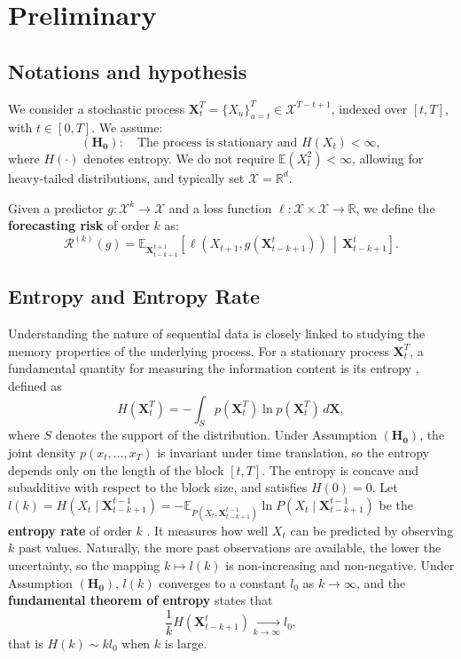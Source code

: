 \documentclass{article}
\begin{document}
\section{Preliminary}
\subsection{Notations and hypothesis} 

We consider a stochastic process $\mathbf{X}_{t}^{T} = \{X_u\}_{u=t}^{T} \in \mathcal{X}^{T-t+1}$, indexed over $[t, T]$, with $t \in [0, T]$. We assume:
\[
\mathbf{(H_0)}: \quad \text{The process is stationary and } H(X_t) < \infty,
\]
where $H(\cdot)$ denotes entropy. We do not require $\mathbb{E}(X_t^2) < \infty$, allowing for heavy-tailed distributions, and typically set $\mathcal{X} = \mathbb{R}^d$.

Given a predictor $g: \mathcal{X}^{k} \to \mathcal{X}$ and a loss function $\ell: \mathcal{X} \times \mathcal{X} \to \mathbb{R}$, we define the \textbf{forecasting risk} of order $k$ as:
\begin{equation}
\mathcal{R}^{(k)}(g) = \mathbb{E}_{\mathbf{X}_{t-k+1}^{t+1}} \left[ \ell(X_{t+1}, g(\mathbf{X}_{t-k+1}^{t})) \,\middle|\, \mathbf{X}_{t-k+1}^{t} \right].
\end{equation}

\subsection{Entropy and Entropy Rate}

Understanding the nature of sequential data is closely linked to studying the memory properties of the underlying process. For a stationary process $\mathbf{X}_{t}^{T}$, a fundamental quantity for measuring the information content is its entropy \cite{shannon1948mathematical}, defined as
\begin{equation}
    H(\mathbf{X}_{t}^{T}) = - \int_{S} p(\mathbf{X}_{t}^{T}) \ln p(\mathbf{X}_{t}^{T}) \, d\mathbf{X},
\end{equation}
where $S$ denotes the support of the distribution. Under Assumption $\mathbf{(H_0)}$, the joint density $p(x_t, \dots, x_T)$ is invariant under time translation, so the entropy depends only on the length of the block $[t, T]$. The entropy is concave and subadditive with respect to the block size, and satisfies $H(0) = 0$. Let $l(k) = H(X_{t} \mid \mathbf{X}_{t-k+1}^{t-1}) = -\mathbb{E}_{P(X_{t}, \mathbf{X}_{t-k+1}^{t-1})} \ln P(X_{t} \mid \mathbf{X}_{t-k+1}^{t-1})$ be the \textbf{entropy rate} of order $k$ \cite{cover1999elements}. It measures how well $X_{t}$ can be predicted by observing $k$ past values. Naturally, the more past observations are available, the lower the uncertainty, so the mapping $k \mapsto l(k)$ is non-increasing and non-negative. 
Under Assumption $\mathbf{(H_0)}$, $l(k)$ converges to a constant $l_0$ as $k \to \infty$, and the \textbf{fundamental theorem of entropy} \cite{shannon1948mathematical} states that
\begin{equation}
\frac{1}{k} H(\mathbf{X}_{t-k+1}^{t}) \underset{k\to\infty}{\longrightarrow} l_0,
\end{equation}
that is $H(k) \sim k l_0$ when $k$ is large.
\end{document}
